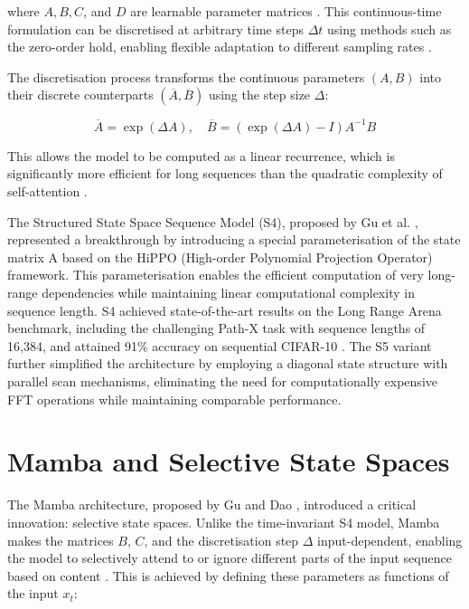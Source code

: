 \documentclass[11pt, a4paper]{report}
\begin{document}
where $A, B, C$, and $D$ are learnable parameter matrices \cite{gu2022efficiently}. This continuous-time formulation can be discretised at arbitrary time steps $\Delta t$ using methods such as the zero-order hold, enabling flexible adaptation to different sampling rates \cite{gu2022efficiently, zubic2024state}. 

The discretisation process transforms the continuous parameters $(A, B)$ into their discrete counterparts $(\overline{A}, \overline{B})$ using the step size $\Delta$:

\begin{equation}
    \overline{A} = \exp(\Delta A), \quad \overline{B} = (\exp(\Delta A) - I)A^{-1}B
\end{equation}

This allows the model to be computed as a linear recurrence, which is significantly more efficient for long sequences than the quadratic complexity of self-attention \cite{gu2023mamba, patro2025from}.

The Structured State Space Sequence Model (S4), proposed by Gu et al. \cite{gu2022efficiently}, represented a breakthrough by introducing a special parameterisation of the state matrix A based on the HiPPO (High-order Polynomial Projection Operator) framework. This parameterisation enables the efficient computation of very long-range dependencies while maintaining linear computational complexity in sequence length. S4 achieved state-of-the-art results on the Long Range Arena benchmark, including the challenging Path-X task with sequence lengths of 16,384, and attained 91\% accuracy on sequential CIFAR-10 \cite{gu2022efficiently}. The S5 variant \cite{smith2023simplified} further simplified the architecture by employing a diagonal state structure with parallel scan mechanisms, eliminating the need for computationally expensive FFT operations while maintaining comparable performance. 

\section{Mamba and Selective State Spaces}
The Mamba architecture, proposed by Gu and Dao \cite{gu2023mamba}, introduced a critical innovation: selective state spaces. Unlike the time-invariant S4 model, Mamba makes the matrices $B$, $C$, and the discretisation step $\Delta$ input-dependent, enabling the model to selectively attend to or ignore different parts of the input sequence based on content \cite{gu2023mamba}. This is achieved by defining these parameters as functions of the input $x_t$:
\end{document}
